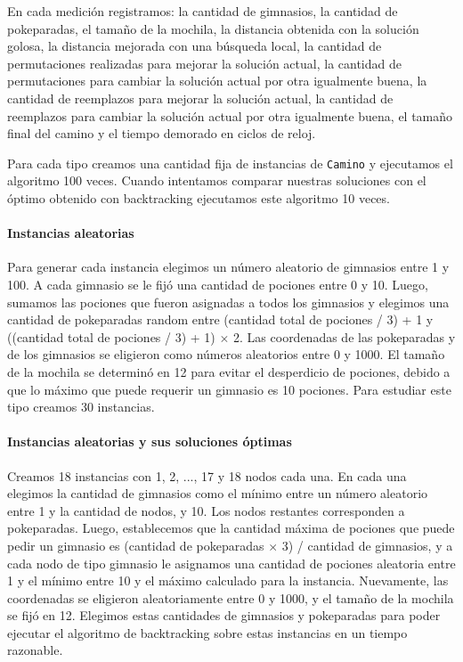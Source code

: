 En cada medici\'on registramos: la cantidad de gimnasios, la cantidad de pokeparadas, el tamaño de la mochila, la distancia obtenida con la soluci\'on golosa, la distancia mejorada con una b\'usqueda local, la cantidad de permutaciones realizadas para mejorar la soluci\'on actual, la cantidad de permutaciones para cambiar la soluci\'on actual por otra igualmente buena, la cantidad de reemplazos para mejorar la soluci\'on actual, la cantidad de reemplazos para cambiar la soluci\'on actual por otra igualmente buena, el tamaño final del camino y el tiempo demorado en ciclos de reloj.

Para cada tipo creamos una cantidad fija de instancias de \texttt{Camino} y ejecutamos el algoritmo 100 veces. Cuando intentamos comparar nuestras soluciones con el \'optimo obtenido con backtracking ejecutamos este algoritmo 10 veces.

\paragraph{Instancias aleatorias}
Para generar cada instancia elegimos un n\'umero aleatorio de gimnasios entre 1 y 100. A cada gimnasio se le fij\'o una cantidad de pociones entre 0 y 10. Luego, sumamos las pociones que fueron asignadas a todos los gimnasios y elegimos una cantidad de pokeparadas random entre (cantidad total de pociones / 3) + 1 y ((cantidad total de pociones / 3) + 1) $\times$ 2. Las coordenadas de las pokeparadas y de los gimnasios se eligieron como n\'umeros aleatorios entre 0 y 1000. El tamaño de la mochila se determin\'o en 12 para evitar el desperdicio de pociones, debido a que lo m\'aximo que puede requerir un gimnasio es 10 pociones. Para estudiar este tipo creamos 30 instancias.

\paragraph{Instancias aleatorias y sus soluciones \'optimas}
Creamos 18 instancias con 1, 2, ..., 17 y 18 nodos cada una. En cada una elegimos la cantidad de gimnasios como el m\'inimo entre un n\'umero aleatorio entre 1 y la cantidad de nodos, y 10. Los nodos restantes corresponden a pokeparadas. Luego, establecemos que la cantidad m\'axima de pociones que puede pedir un gimnasio es (cantidad de pokeparadas $\times$ 3) / cantidad de gimnasios, y a cada nodo de tipo gimnasio le asignamos una cantidad de pociones aleatoria entre 1 y el m\'inimo entre 10 y el m\'aximo calculado para la instancia. Nuevamente, las coordenadas se eligieron aleatoriamente entre 0 y 1000, y el tamaño de la mochila se fij\'o en 12. Elegimos estas cantidades de 
gimnasios y pokeparadas para poder ejecutar el algoritmo de backtracking sobre estas instancias en un tiempo razonable.

